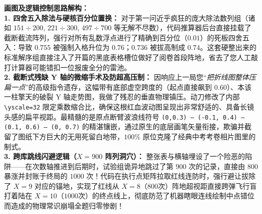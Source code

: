\vspace{0.4cm}
{\small\color{blue!70!black}
\textbf{画图及逻辑控制思路解构：}\\
\textbf{1. 四舍五入除法与硬核百分位置换：} 对于第一问近乎疯狂的庞大除法数列组（诸如 $151 \div 200$, $221 \div 300$, $497 \div 700$ 等无解不尽数），代码推算器后台直接挂载了截断截流阵列，强行对所有乱数浮点进行了精确到百分位（$0.01$）的死板四舍五入：导致 $0.755$ 被强制入格升位为 $0.76$；$0.736$ 被拔高制成 $0.74$。这套硬整出来的标准解序组直接注入了开篇的黑底表格槽位做好了阅卷首段阵地，省去了您人工敲打计算器可能错扣一位报废全分的雷池。\\
\textbf{2. 截断式残缺 Y 轴的微缩手术及防超高压制：} 因响应上一局您“\textit{把折线图整体压扁一点}”的高级指令遗存，这幅带有底部虚空跨度的（起点直接飙到 $0.60$）、本该一柱擎天的破裂 Y 轴走势图，我做了残忍的垂直物理镇压。动刀修改了内部 \texttt{\textbackslash{}yscale=32} 限定乘数缩合比，确保这根红血波动图呈现出非常舒适的、具备长镜头感的扁平视距。最精髓的是原点断臂波浪线符号 \texttt{(0,0.3) -- (-0.1, 0.4) -- (0.1, 0.6) -- (0, 0.7)} 的精湛镶嵌，通过原生的底层画笔矢量衔接，欺骗并截留了图纸下方巨大的无用死留白地带，$100\%$ 原位克隆了经典中考考卷相片图里的制式。\\
\textbf{3. 跨库跳线闪避逻辑（$X=900$ 阵列洞穴）：} 整张表与横轴埋设了一个险恶的陷阱——在次数轴推进到后期时，试验组诡异地跳过了第 $900$ 次的记录，直接由 $800$ 暴涨并封账于终局的 $1000$ 次！代码在执行点矩阵拉取红线连防时，强行避让拔除了 $X=9$ 对应的锚地，实现了红线从 $X=8$（$800$次）阵地超视距直接跨弹飞行盲打着陆在 $X=10$（$1000$次）的终点线上，彻底防范了机器瞎眼连线绘制中点错位而造成的物理常识崩塌全题归零惨剧！
}

\newpage
